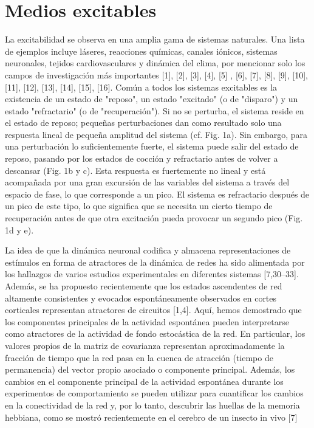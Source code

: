\section{Medios excitables}\label{sec:mediosexcitables}



La excitabilidad se observa en una amplia gama de sistemas naturales. Una lista de ejemplos incluye láseres, reacciones químicas, canales iónicos, sistemas neuronales, tejidos cardiovasculares y dinámica del clima, por mencionar solo los campos de investigación más importantes [1], [2], [3], [4], [5] , [6], [7], [8], [9], [10], [11], [12], [13], [14], [15], [16]. Común a todos los sistemas excitables es la existencia de un estado de "reposo", un estado "excitado" (o de "disparo") y un estado "refractario" (o de "recuperación"). Si no se perturba, el sistema reside en el estado de reposo; pequeñas perturbaciones dan como resultado solo una respuesta lineal de pequeña amplitud del sistema (cf. Fig. 1a). Sin embargo, para una perturbación lo suficientemente fuerte, el sistema puede salir del estado de reposo, pasando por los estados de cocción y refractario antes de volver a descansar (Fig. 1b y c). Esta respuesta es fuertemente no lineal y está acompañada por una gran excursión de las variables del sistema a través del espacio de fase, lo que corresponde a un pico. El sistema es refractario después de un pico de este tipo, lo que significa que se necesita un cierto tiempo de recuperación antes de que otra excitación pueda provocar un segundo pico (Fig. 1d y e).



La idea de que la dinámica neuronal codifica y almacena representaciones de estímulos en forma de atractores de la dinámica de redes ha sido alimentada por los hallazgos de varios estudios experimentales en diferentes sistemas [7,30–33]. Además, se ha propuesto recientemente que los estados ascendentes de red altamente consistentes y evocados espontáneamente observados en cortes corticales representan atractores de circuitos [1,4]. Aquí, hemos demostrado que los componentes principales de la actividad espontánea pueden interpretarse como atractores de la actividad de fondo estocástica de la red. En particular, los valores propios de la matriz de covarianza representan aproximadamente la fracción de tiempo que la red pasa en la cuenca de atracción (tiempo de permanencia) del vector propio asociado o componente principal. Además, los cambios en el componente principal de la actividad espontánea durante los experimentos de comportamiento se pueden utilizar para cuantificar los cambios en la conectividad de la red y, por lo tanto, descubrir las huellas de la memoria hebbiana, como se mostró recientemente en el cerebro de un insecto in vivo [7]




